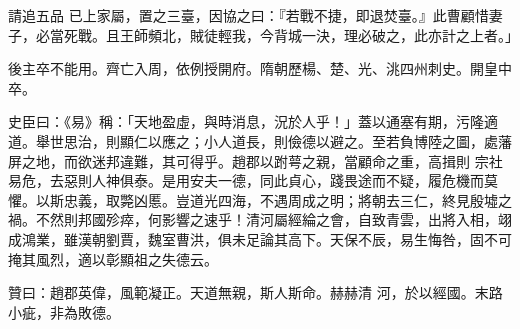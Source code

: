 \begin{pinyinscope}
 請追五品
 已上家屬，置之三臺，因協之曰：『若戰不捷，即退焚臺。』此曹顧惜妻子，必當死戰。且王師頻北，賊徒輕我，今背城一決，理必破之，此亦計之上者。」



 後主卒不能用。齊亡入周，依例授開府。隋朝歷楊、楚、光、洮四州刺史。開皇中卒。



 史臣曰：《易》稱：「天地盈虛，與時消息，況於人乎！」蓋以通塞有期，污隆適道。舉世思治，則顯仁以應之；小人道長，則儉德以避之。至若負博陸之圖，處藩屏之地，而欲迷邦違難，其可得乎。趙郡以跗萼之親，當顧命之重，高揖則
 宗社易危，去惡則人神俱泰。是用安夫一德，同此貞心，踐畏途而不疑，履危機而莫懼。以斯忠義，取斃凶慝。豈道光四海，不遇周成之明；將朝去三仁，終見殷墟之禍。不然則邦國殄瘁，何影響之速乎！清河屬經綸之會，自致青雲，出將入相，翊成鴻業，雖漢朝劉賈，魏室曹洪，俱未足論其高下。天保不辰，易生悔咎，固不可掩其風烈，適以彰顯祖之失德云。



 贊曰：趙郡英偉，風範凝正。天道無親，斯人斯命。赫赫清
 河，於以經國。末路小疵，非為敗德。



\end{pinyinscope}